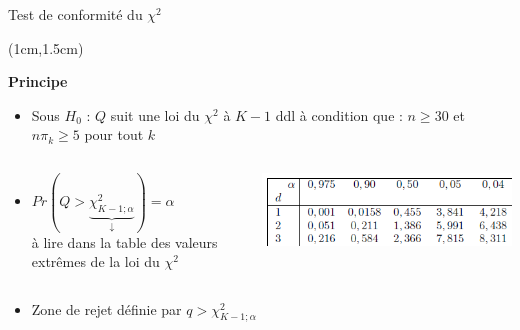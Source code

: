 \documentclass{beamer}
\begin{document}

\begin{frame}{Test de conformité du $\chi^2$}
\begin{textblock*}{\textwidth}(1cm,1.5cm)

\begin{center}{\bf \Large Principe} \end{center}

\begin{itemize}
\item  Sous $H_0$ : $Q$ suit une loi du $\chi^2$ à $K-1$ ddl
à condition que : $n\geq 30$ et $n\pi_k \geq 5$ pour tout $k$
\vspace{0.3cm}
\end{itemize}

\begin{columns}[c]
\begin{column}{5cm}
\begin{itemize}
\item $Pr(Q > \underbrace{\chi^2_{K-1 ; \alpha}}_{\downarrow} ) = \alpha$ \\
\vspace{0.2cm}
à lire dans la table des valeurs extrêmes de la loi du $\chi^2$  
\end{itemize}
\end{column}

\begin{column}{5cm}
\includegraphics[scale=0.5]{images/table_chi2.png}
\end{column}
\end{columns}

\vspace{0.3cm}
\begin{itemize}
\item Zone de rejet définie par $q > \chi^2_{K-1 ; \alpha}$ \\
\end{itemize}
\end{textblock*}

\end{frame}

\end{document}
